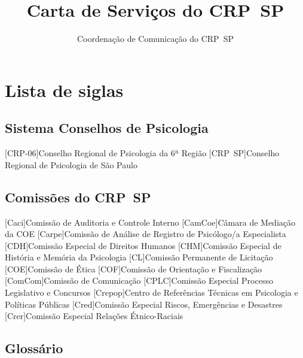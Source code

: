 \documentclass[oneside, a4paper, 10pt, brazil]{abntex2}
\title{Carta de Serviços do CRP~SP}
\author{Coordenação de Comunicação do CRP~SP}
\begin{document}
\pretextual
\pagestyle{pretext}
\chapter*{Lista de siglas}
\section*{Sistema Conselhos de Psicologia}
\begin{acronym}
	[CRP-06]{Conselho Regional de Psicologia da 6ª Região}
	[CRP~SP]{Conselho Regional de Psicologia de São Paulo}
\end{acronym}
\section*{Comissões do CRP~SP}
\begin{acronym}
	[Caci]{Comissão de Auditoria e Controle Interno}
	[CamCoe]{Câmara de Mediação da COE}
	[Carpe]{Comissão de Análise de Registro de Psicólogo/a Especialista}
	[CDH]{Comissão Especial de Direitos Humanos}
	[CHM]{Comissão Especial de História e Memória da Psicologia}
	[CL]{Comissão Permanente de Licitação}
	[COE]{Comissão de Ética}
	[COF]{Comissão de Orientação e Fiscalização}
	[ComCom]{Comissão de Comunicação}
	[CPLC]{Comissão Especial Processo Legislativo e Concursos}
	[Crepop]{Centro de Referências Técnicas em Psicologia e Políticas Públicas}
	[Cred]{Comissão Especial Riscos, Emergências e Desastres}
	[Crer]{Comissão Especial Relações Étnico-Raciais}
\end{acronym}

\clearpage
%
\color{crp1}\tableofcontents*
\clearpage
%
\color{black}
\textual
%
\pagestyle{crp}



%
\postextual
\pagestyle{pretext}

\begin{apendicesenv}
	\pagestyle{crp}
	\justifying
\chapter{Glossário}
\printglossary[title=""]

\end{apendicesenv}
\end{document}
